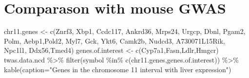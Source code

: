 \documentclass[
]{article}
\newenvironment{Shaded}{\begin{snugshade}}{\end{snugshade}}
\newcommand{\AttributeTok}[1]{\textcolor[rgb]{0.77,0.63,0.00}{#1}}
\newcommand{\FunctionTok}[1]{\textcolor[rgb]{0.00,0.00,0.00}{#1}}
\newcommand{\NormalTok}[1]{#1}
\newcommand{\OtherTok}[1]{\textcolor[rgb]{0.56,0.35,0.01}{#1}}
\newcommand{\SpecialCharTok}[1]{\textcolor[rgb]{0.00,0.00,0.00}{#1}}
\newcommand{\StringTok}[1]{\textcolor[rgb]{0.31,0.60,0.02}{#1}}
\begin{document}
\hypertarget{comparason-with-mouse-gwas}{%
\section{Comparason with mouse GWAS}\label{comparason-with-mouse-gwas}}

\begin{Shaded}
\begin{Highlighting}[]
\NormalTok{chr11.genes }\OtherTok{\textless{}{-}} \FunctionTok{c}\NormalTok{(}\StringTok{\textquotesingle{}Znrf3\textquotesingle{}}\NormalTok{, }\StringTok{\textquotesingle{}Xbp1\textquotesingle{}}\NormalTok{, }\StringTok{\textquotesingle{}Ccdc117\textquotesingle{}}\NormalTok{, }\StringTok{\textquotesingle{}Ankrd36\textquotesingle{}}\NormalTok{, }\StringTok{\textquotesingle{}Mrps24\textquotesingle{}}\NormalTok{, }\StringTok{\textquotesingle{}Urgcp\textquotesingle{}}\NormalTok{, }\StringTok{\textquotesingle{}Dbnl\textquotesingle{}}\NormalTok{, }\StringTok{\textquotesingle{}Pgam2\textquotesingle{}}\NormalTok{, }\StringTok{\textquotesingle{}Polm\textquotesingle{}}\NormalTok{, }\StringTok{\textquotesingle{}Aebp1\textquotesingle{}}\NormalTok{,}\StringTok{\textquotesingle{}Pold2\textquotesingle{}}\NormalTok{, }\StringTok{\textquotesingle{}Myl7\textquotesingle{}}\NormalTok{, }\StringTok{\textquotesingle{}Gck\textquotesingle{}}\NormalTok{, }\StringTok{\textquotesingle{}Ykt6\textquotesingle{}}\NormalTok{, }\StringTok{\textquotesingle{}Camk2b\textquotesingle{}}\NormalTok{, }\StringTok{\textquotesingle{}Nudcd3\textquotesingle{}}\NormalTok{, }\StringTok{\textquotesingle{}A730071L15Rik\textquotesingle{}}\NormalTok{, }\StringTok{\textquotesingle{}Npc1l1\textquotesingle{}}\NormalTok{, }\StringTok{\textquotesingle{}Ddx56\textquotesingle{}}\NormalTok{,}\StringTok{\textquotesingle{}Tmed4\textquotesingle{}}\NormalTok{)}
\NormalTok{genes.of.interest }\OtherTok{\textless{}{-}} \FunctionTok{c}\NormalTok{(}\StringTok{\textquotesingle{}Cyp7a1\textquotesingle{}}\NormalTok{,}\StringTok{\textquotesingle{}Fasn\textquotesingle{}}\NormalTok{,}\StringTok{\textquotesingle{}Ldlr\textquotesingle{}}\NormalTok{,}\StringTok{\textquotesingle{}Hmgcr\textquotesingle{}}\NormalTok{)}
\NormalTok{twas.data.ncd }\SpecialCharTok{\%\textgreater{}\%}
  \FunctionTok{filter}\NormalTok{(symbol }\SpecialCharTok{\%in\%} \FunctionTok{c}\NormalTok{(chr11.genes,genes.of.interest)) }\SpecialCharTok{\%\textgreater{}\%}
  \FunctionTok{kable}\NormalTok{(}\AttributeTok{caption=}\StringTok{"Genes in the chromosome 11 interval with liver expression"}\NormalTok{)}
\end{Highlighting}
\end{Shaded}
\end{document}
